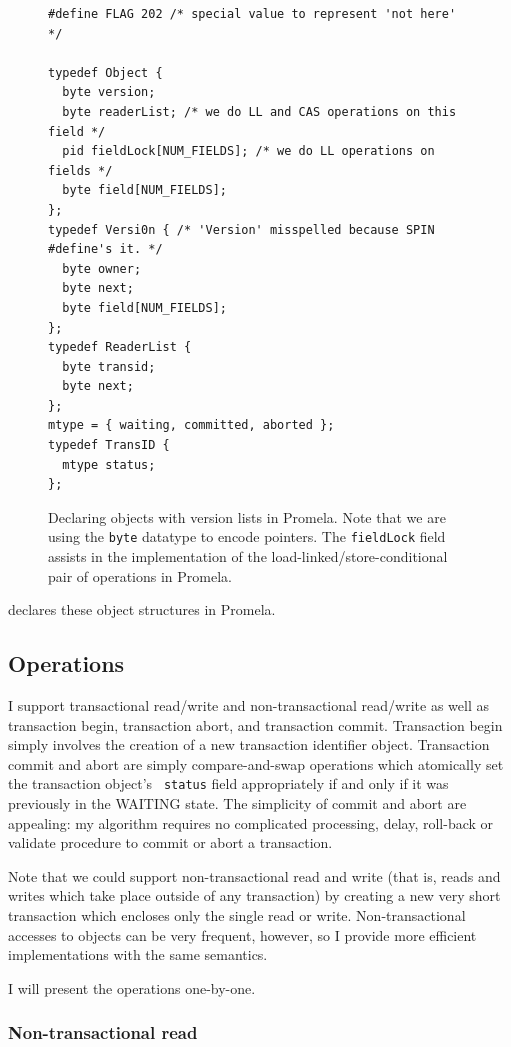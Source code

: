 \begin{figure}
\sis\fontsize{9}{10}
\begin{verbatim}
#define FLAG 202 /* special value to represent 'not here' */

typedef Object {
  byte version;
  byte readerList; /* we do LL and CAS operations on this field */
  pid fieldLock[NUM_FIELDS]; /* we do LL operations on fields */
  byte field[NUM_FIELDS];
};
typedef Versi0n { /* 'Version' misspelled because SPIN #define's it. */
  byte owner;
  byte next;
  byte field[NUM_FIELDS];
};
typedef ReaderList {
  byte transid;
  byte next;
};
mtype = { waiting, committed, aborted };
typedef TransID {
  mtype status;
};
\end{verbatim}
\caption{Declaring objects with version lists in Promela.  Note that
  we are using the \texttt{byte} datatype to encode pointers.
  The \texttt{fieldLock} field assists in the implementation of the
  load-linked/store-conditional pair of operations in Promela.}
\label{fig:promdecl}
\end{figure}

 declares these object structures in Promela.

\subsection{Operations}%
I support transactional read/write and non-transactional read/write
as well as transaction begin, transaction abort, and transaction
commit.  Transaction begin simply involves the creation of a new
transaction identifier object.  Transaction commit and abort are simply
compare-and-swap operations which atomically set the transaction object's {\tt
  status} field appropriately if and only if it was previously in the
WAITING state.
The simplicity of commit and abort are appealing: my algorithm
requires no complicated processing, delay, roll-back or validate
procedure to commit or abort a transaction.

Note that we could support non-transactional read and write (that is,
reads and writes which take place outside of any transaction) by
creating a new very short transaction which encloses only the single
read or write.  Non-transactional accesses to objects can be very
frequent, however, so I provide more efficient implementations with
the same semantics.

I will present the operations one-by-one.

\subsubsection{Non-transactional read}

